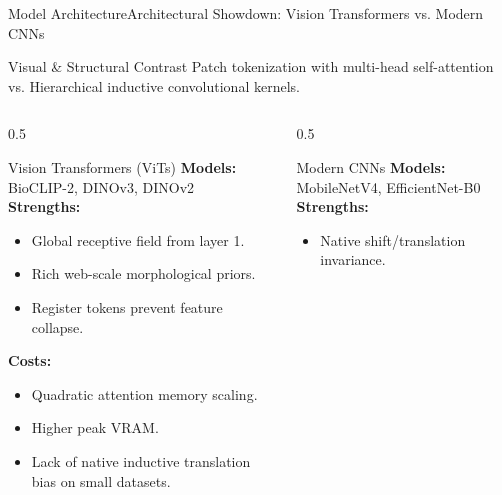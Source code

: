 \begin{frame}{Model Architecture}{Architectural Showdown: Vision Transformers vs. Modern CNNs}
    \vspace{-0.2cm}
    \begin{block}{Visual \& Structural Contrast}
        \scriptsize
        Patch tokenization with multi-head self-attention vs. Hierarchical inductive convolutional kernels.
    \end{block}

    \vspace{-0.2cm}
    \begin{columns}[T]
        \begin{column}{0.5\textwidth}
            \begin{block}{Vision Transformers (ViTs)}
                \scriptsize
                \textbf{Models:} BioCLIP-2, DINOv3, DINOv2\\[0.1cm]
                \textbf{Strengths:}
                \begin{itemize}
                    \item Global receptive field from layer 1.
                    \item Rich web-scale morphological priors.
                    \item Register tokens prevent feature collapse.
                \end{itemize}
                \vspace{0.1cm}
                \textbf{Costs:}
                \begin{itemize}
                    \item Quadratic attention memory scaling.
                    \item Higher peak VRAM.
                    \item Lack of native inductive translation bias on small datasets.
                \end{itemize}
            \end{block}
        \end{column}
        \begin{column}{0.5\textwidth}
            \begin{block}{Modern CNNs}
                \scriptsize
                \textbf{Models:} MobileNetV4, EfficientNet-B0\\[0.1cm]
                \textbf{Strengths:}
                \begin{itemize}
                    \item Native shift/translation invariance.

\end{itemize}
\end{block}
\end{column}
\end{columns}
\end{frame}

